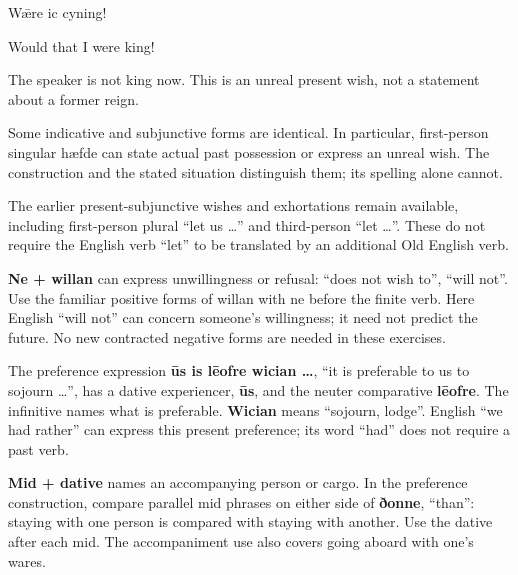 Wǣre ic cyning!

Would that I were king!

The speaker is not king now. This is an unreal present wish, not a statement about a former reign.

Some indicative and subjunctive forms are identical. In particular, first-person singular hæfde can state actual past possession or express an unreal wish. The construction and the stated situation distinguish them; its spelling alone cannot.

The earlier present-subjunctive wishes and exhortations remain available, including first-person plural “let us …” and third-person “let …”. These do not require the English verb “let” to be translated by an additional Old English verb.

\textbf{Ne + willan} can express unwillingness or refusal: “does not wish to”, “will not”. Use the familiar positive forms of willan with ne before the finite verb. Here English “will not” can concern someone’s willingness; it need not predict the future. No new contracted negative forms are needed in these exercises.

The preference expression \textbf{ūs is lēofre wician …}, “it is preferable to us to sojourn …”, has a dative experiencer, \textbf{ūs}, and the neuter comparative \textbf{lēofre}. The infinitive names what is preferable. \textbf{Wician} means “sojourn, lodge”. English “we had rather” can express this present preference; its word “had” does not require a past verb.

\textbf{Mid + dative} names an accompanying person or cargo. In the preference construction, compare parallel mid phrases on either side of \textbf{ðonne}, “than”: staying with one person is compared with staying with another. Use the dative after each mid. The accompaniment use also covers going aboard with one’s wares.

